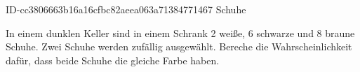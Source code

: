 \begin{exercise}
      {ID-cc3806663b16a16cfbc82aeea063a71384771467}
      {Schuhe}
  \ifproblem\problem\par
    In einem dunklen Keller sind in einem Schrank 2 weiße, 6 schwarze und 8
    braune Schuhe. Zwei Schuhe werden zufällig ausgewählt. Bereche die
    Wahrscheinlichkeit dafür, dass beide Schuhe die gleiche Farbe haben.
  \fi
\end{exercise}
